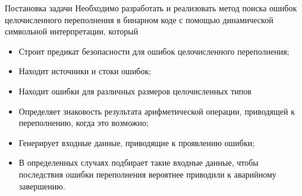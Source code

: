 \documentclass[10pt]{beamer}
\begin{document}
%

\begin{frame}{Постановка задачи}
Необходимо разработать и реализовать метод поиска ошибок целочисленного переполнения в
бинарном коде с помощью динамической символьной интерпретации, который
\begin{itemize}
    \item Строит предикат безопасности для ошибок целочисленного переполнения;
    \item Находит источники и стоки ошибок;
    \item Находит ошибки для различных размеров целочисленных типов
    \item Определяет знаковость результата арифметической операции, приводящей к
        переполнению, когда это возможно;
    \item Генерирует входные данные, приводящие к проявлению ошибки;
    \item В определенных случаях подбирает такие входные данные, чтобы
        последствия ошибки переполнения вероятнее приводили к аварийному
        завершению.
\end{itemize}
\end{frame}
\end{document}
